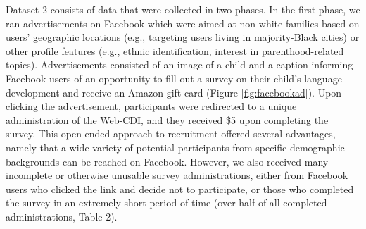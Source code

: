 \documentclass[
  english,
  ,man,floatsintext]{apa6}
\begin{document}
\begin{table}

\caption{\label{tab:unnamed-chunk-8}Exclusions from Dataset 2: recent data collection using Facebook and Prolific.}
\centering
{}
\end{table}

Dataset 2 consists of data that were collected in two phases. In the first phase, we ran advertisements on Facebook which were aimed at non-white families based on users' geographic locations (e.g., targeting users living in majority-Black cities) or other profile features (e.g., ethnic identification, interest in parenthood-related topics). Advertisements consisted of an image of a child and a caption informing Facebook users of an opportunity to fill out a survey on their child's language development and receive an Amazon gift card (Figure \ref{fig:facebookad}). Upon clicking the advertisement, participants were redirected to a unique administration of the Web-CDI, and they received \$5 upon completing the survey. This open-ended approach to recruitment offered several advantages, namely that a wide variety of potential participants from specific demographic backgrounds can be reached on Facebook. However, we also received many incomplete or otherwise unusable survey administrations, either from Facebook users who clicked the link and decide not to participate, or those who completed the survey in an extremely short period of time (over half of all completed administrations, Table 2).
\end{document}
